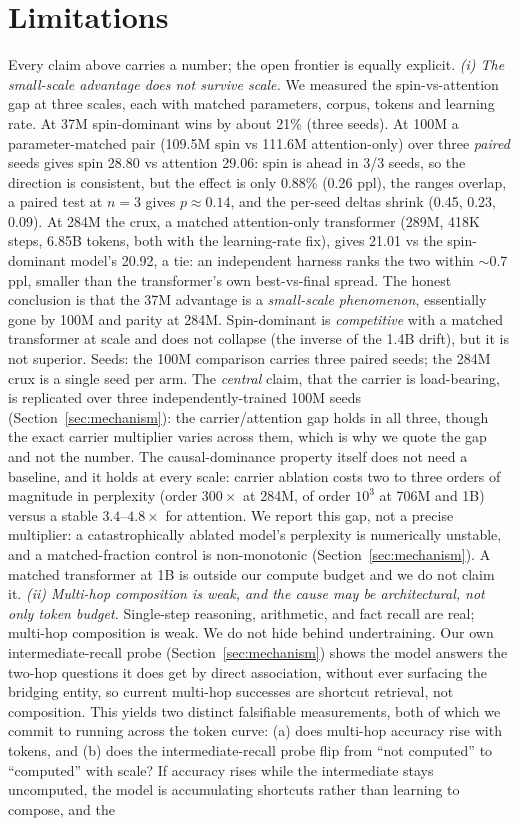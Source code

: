 \documentclass[10pt,twocolumn]{article}
\begin{document}
\section{Limitations}
\label{sec:limitations}
Every claim above carries a number; the open frontier is equally explicit. \emph{(i) The small-scale advantage does not survive scale.} We measured the spin-vs-attention gap at three scales, each with matched parameters, corpus, tokens and learning rate. At 37M spin-dominant wins by about 21\% (three seeds). At 100M a parameter-matched pair (109.5M spin vs 111.6M attention-only) over three \emph{paired} seeds gives spin 28.80 vs attention 29.06: spin is ahead in 3/3 seeds, so the direction is consistent, but the effect is only 0.88\% (0.26 ppl), the ranges overlap, a paired test at $n=3$ gives $p \approx 0.14$, and the per-seed deltas shrink (0.45, 0.23, 0.09). At 284M the crux, a matched attention-only transformer (289M, 418K steps, 6.85B tokens, both with the learning-rate fix), gives 21.01 vs the spin-dominant model's 20.92, a tie: an independent harness ranks the two within $\sim$0.7 ppl, smaller than the transformer's own best-vs-final spread. The honest conclusion is that the 37M advantage is a \emph{small-scale phenomenon}, essentially gone by 100M and parity at 284M. Spin-dominant is \emph{competitive} with a matched transformer at scale and does not collapse (the inverse of the 1.4B drift), but it is not superior. Seeds: the 100M comparison carries three paired seeds; the 284M crux is a single seed per arm. The \emph{central} claim, that the carrier is load-bearing, is replicated over three independently-trained 100M seeds (Section~\ref{sec:mechanism}): the carrier/attention gap holds in all three, though the exact carrier multiplier varies across them, which is why we quote the gap and not the number. The causal-dominance property itself does not need a baseline, and it holds at every scale: carrier ablation costs two to three orders of magnitude in perplexity (order $300\times$ at 284M, of order $10^3$ at 706M and 1B) versus a stable $3.4$--$4.8\times$ for attention. We report this gap, not a precise multiplier: a catastrophically ablated model's perplexity is numerically unstable, and a matched-fraction control is non-monotonic (Section~\ref{sec:mechanism}). A matched transformer at 1B is outside our compute budget and we do not claim it. \emph{(ii) Multi-hop composition is weak, and the cause may be architectural, not only token budget.} Single-step reasoning, arithmetic, and fact recall are real; multi-hop composition is weak. We do not hide behind undertraining. Our own intermediate-recall probe (Section~\ref{sec:mechanism}) shows the model answers the two-hop questions it does get by direct association, without ever surfacing the bridging entity, so current multi-hop successes are shortcut retrieval, not composition. This yields two distinct falsifiable measurements, both of which we commit to running across the token curve: (a) does multi-hop accuracy rise with tokens, and (b) does the intermediate-recall probe flip from ``not computed'' to ``computed'' with scale? If accuracy rises while the intermediate stays uncomputed, the model is accumulating shortcuts rather than learning to compose, and the 
\end{document}
